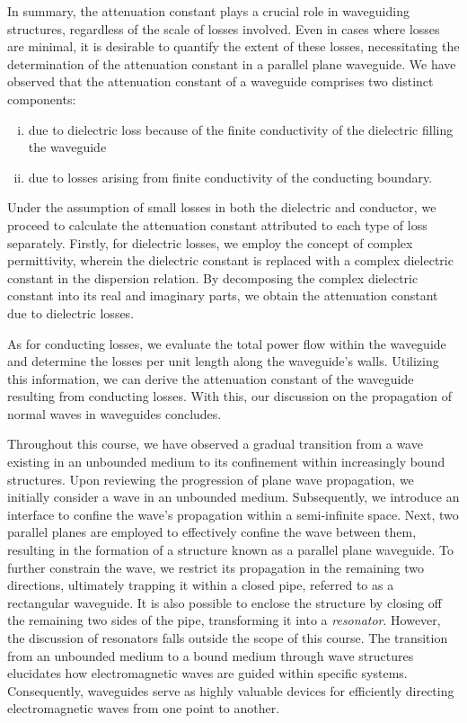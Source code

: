 In summary, the attenuation constant plays a crucial role in waveguiding structures, regardless of the scale of losses involved. Even in cases where losses are minimal, it is desirable to quantify the extent of these losses, necessitating the determination of the attenuation constant in a parallel plane waveguide. We have observed that the attenuation constant of a waveguide comprises two distinct components:
\begin{enumerate}[(i)]
\item due to dielectric loss because of the finite conductivity of the dielectric filling the waveguide
\item due to losses arising from finite conductivity of the conducting boundary.
\end{enumerate}
Under the assumption of small losses in both the dielectric and conductor, we proceed to calculate the attenuation constant attributed to each type of loss separately. Firstly, for dielectric losses, we employ the concept of complex permittivity, wherein the dielectric constant is replaced with a complex dielectric constant in the dispersion relation. By decomposing the complex dielectric constant into its real and imaginary parts, we obtain the attenuation constant due to dielectric losses.

As for conducting losses, we evaluate the total power flow within the waveguide and determine the losses per unit length along the waveguide's walls. Utilizing this information, we can derive the attenuation constant of the waveguide resulting from conducting losses. With this, our discussion on the propagation of normal waves in waveguides concludes.

Throughout this course, we have observed a gradual transition from a wave existing in an unbounded medium to its confinement within increasingly bound structures. Upon reviewing the progression of plane wave propagation, we initially consider a wave in an unbounded medium. Subsequently, we introduce an interface to confine the wave's propagation within a semi-infinite space. Next, two parallel planes are employed to effectively confine the wave between them, resulting in the formation of a structure known as a parallel plane waveguide. To further constrain the wave, we restrict its propagation in the remaining two directions, ultimately trapping it within a closed pipe, referred to as a rectangular waveguide. It is also possible to enclose the structure by closing off the remaining two sides of the pipe, transforming it into a \emph{resonator}. However, the discussion of resonators falls outside the scope of this course. The transition from an unbounded medium to a bound medium through wave structures elucidates how electromagnetic waves are guided within specific systems. Consequently, waveguides serve as highly valuable devices for efficiently directing electromagnetic waves from one point to another.
